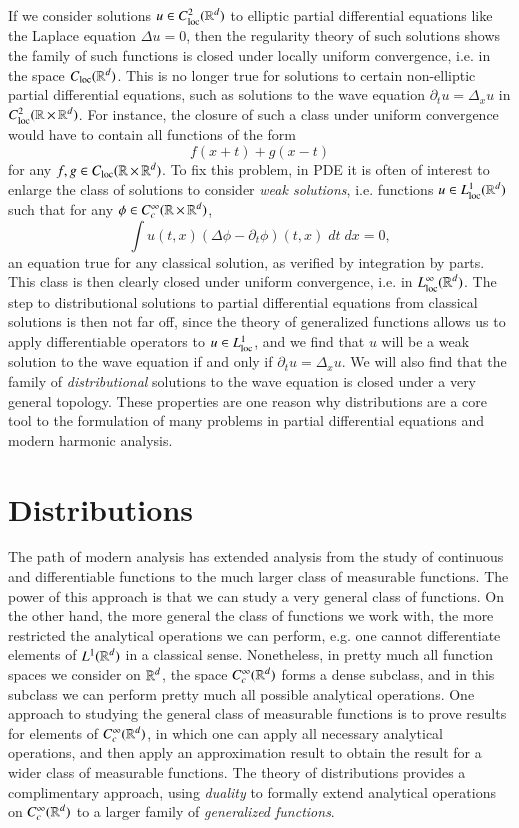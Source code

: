 If we consider solutions $u \in C^2_{\text{loc}}(\operatorname{\mathbb{R}}^d)$ to elliptic partial differential equations like the Laplace equation $\Delta u = 0$, then the regularity theory of such solutions shows the family of such functions is closed under locally uniform convergence, i.e. in the space $C_{\text{loc}}(\operatorname{\mathbb{R}}^d)$. This is no longer true for solutions to certain non-elliptic partial differential equations, such as solutions to the wave equation $\partial_t u = \Delta_x u$ in $C^2_{\text{loc}}(\operatorname{\mathbb{R}} \times \operatorname{\mathbb{R}}^d)$. For instance, the closure of such a class under uniform convergence would have to contain all functions of the form
%
\[ f(x+t) + g(x-t) \]
%
for any $f,g \in C_{\text{loc}}(\operatorname{\mathbb{R}} \times \operatorname{\mathbb{R}}^d)$. To fix this problem, in PDE it is often of interest to enlarge the class of solutions to consider \emph{weak solutions}, i.e. functions $u \in L^1_{\text{loc}}(\operatorname{\mathbb{R}}^d)$ such that for any $\phi \in C_c^\infty(\operatorname{\mathbb{R}} \times \operatorname{\mathbb{R}}^d)$,
%
\[ \int u(t,x) (\Delta \phi - \partial_t \phi)(t,x)\; dt\; dx = 0, \]
%
an equation true for any classical solution, as verified by integration by parts. This class is then clearly closed under uniform convergence, i.e. in $L^\infty_{\text{loc}}(\operatorname{\mathbb{R}}^d)$. The step to distributional solutions to partial differential equations from classical solutions is then not far off, since the theory of generalized functions allows us to apply differentiable operators to $u \in L^1_{\text{loc}}$, and we find that $u$ will be a weak solution to the wave equation if and only if $\partial_t u = \Delta_x u$. We will also find that the family of \emph{distributional} solutions to the wave equation is closed under a very general topology. These properties are one reason why distributions are a core tool to the formulation of many problems in partial differential equations and modern harmonic analysis.

\section{Distributions}

The path of modern analysis has extended analysis from the study of continuous and differentiable functions to the much larger class of measurable functions. The power of this approach is that we can study a very general class of functions. On the other hand, the more general the class of functions we work with, the more restricted the analytical operations we can perform, e.g. one cannot differentiate elements of $L^1(\operatorname{\mathbb{R}}^d)$ in a classical sense. Nonetheless, in pretty much all function spaces we consider on $\operatorname{\mathbb{R}}^d$, the space $C^\infty_c(\operatorname{\mathbb{R}}^d)$ forms a dense subclass, and in this subclass we can perform pretty much all possible analytical operations. One approach to studying the general class of measurable functions is to prove results for elements of $C^\infty_c(\operatorname{\mathbb{R}}^d)$, in which one can apply all necessary analytical operations, and then apply an approximation result to obtain the result for a wider class of measurable functions. The theory of distributions provides a complimentary approach, using \emph{duality} to formally extend analytical operations on $C^\infty_c(\operatorname{\mathbb{R}}^d)$ to a larger family of \emph{generalized functions}.

